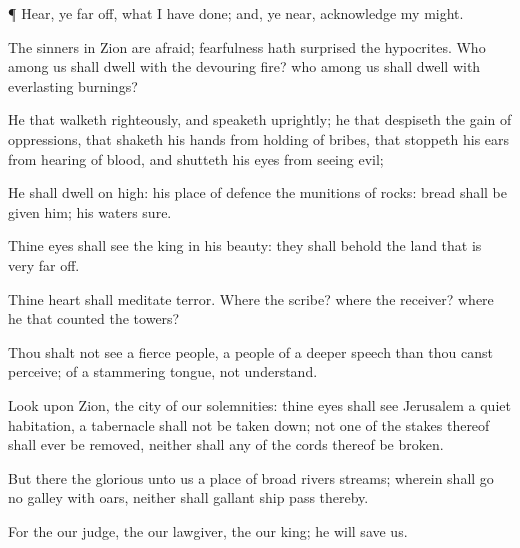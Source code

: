 {\par }{\PP {}¶
Hear, ye
{} far
off, what I have
done; and, ye
{}
near,
acknowledge my
might.

The
sinners in
Zion are
afraid;
fearfulness hath
surprised the
hypocrites. Who among us shall
dwell with the
devouring
fire? who among us shall
dwell with
everlasting
burnings?

He that
walketh
righteously, and
speaketh
uprightly; he that
despiseth the
gain of
oppressions, that
shaketh his
hands from
holding of
bribes, that
stoppeth his
ears from
hearing of
blood, and
shutteth his
eyes from
seeing
evil;

He shall
dwell on
high: his place of
defence
{} the
munitions of
rocks:
bread shall be
given him; his
waters
{}
sure.

Thine
eyes shall
see the
king in his
beauty: they shall
behold the
land that is very far
off.

Thine
heart shall
meditate
terror. Where
{} the
scribe? where
{} the
receiver? where
{} he that
counted the
towers?

Thou shalt not
see a
fierce
people, a
people of a
deeper
speech than thou canst
perceive; of a
stammering
tongue,
{} not
understand.

Look upon
Zion, the
city of our
solemnities: thine
eyes shall
see
Jerusalem a
quiet
habitation, a
tabernacle
{} shall not be taken
down; not one of the
stakes thereof shall
ever be
removed, neither shall any of the
cords thereof be
broken.

But there the
glorious
{}
{} unto us a
place of
broad
rivers
{}
streams; wherein shall
go
no
galley with
oars, neither shall
gallant
ship
pass thereby.

For the
{}
{} our
judge, the
{}
{} our
lawgiver, the
{}
{} our
king; he will
save us.

}
